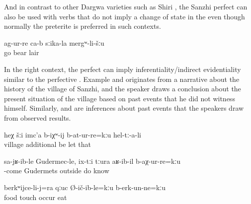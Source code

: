 And in contrast to other Dargwa varieties such as Shiri \citep{BelyaevInPreparation}, the Sanzhi perfect can also be used with verbs that do not imply a change of state in the   even though normally the preterite is preferred in such contexts. 

\begin{exe}
	\ex	\label{ex:‎‎‎(Apparently,) they have gone to the cave of the bear}
	\gll	ag-ur-re	ca-b	sːika-la	mergʷ-li-šːu\\
		go		bear	lair\\
	\glt	{}
\end{exe}

In the right context, the perfect can imply inferentiality\slash indirect evidentiality similar to the perfective . Example  and originates from a narrative about the history of the village of Sanzhi, and the speaker draws a conclusion about the present situation of the village based on past events that he did not witness himself. Similarly,  and  are inferences about past events that the speakers draw from observed results.


%
\begin{exe}
	\ex	\label{ex:‎(Apparently,) they have not allowed the village to grow}
	\gll	heχ	šːi	imc'a	b-iχʷ-ij	b-at-ur-re=kːu	hel-tː-a-li\\
			village	additional	be	let	that\\
	\glt	{}

	\ex	\label{ex:‎(Apparently,) when he came to Gudermets he did not know that they had been thrown out (of the village)}
	\gll	sa-jʁ-ib-le	Gudermec-le,		ix-tːi	tːura	aʁ-ib-il	b-aχ-ur-re=kːu\\
		-come	Gudermets		outside	do	know\\
	\glt	{}

	\ex	\label{ex:‎‎(Apparently,) he also has not touched the food, he has not eaten}
	\gll	berkʷijce-li-j=ra	qːuc	Ø-ič-ib-le=kːu		b-erk-un-ne=kːu\\
		food	touch	occur	eat\\
	\glt	{}
\end{exe}

